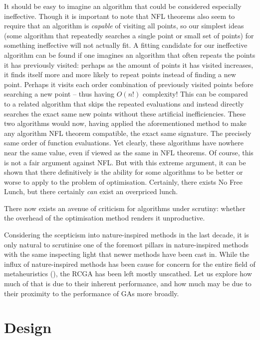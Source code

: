 \documentclass[
  a4paper,
]{article}
\newcommand{\+}{\phantom{-}}
\begin{document}
It should be easy to imagine an algorithm that could be considered
especially ineffective. Though it is important to note that NFL theorems
also seem to require that an algorithm is \emph{capable} of visiting all
points, so our simplest ideas (some algorithm that repeatedly searches a
single point or small set of points) for something ineffective will not
actually fit. A fitting candidate for our ineffective algorithm can be
found if one imagines an algorithm that often repeats the points it has
previously visited: perhaps as the amount of points it has visited
increases, it finds itself more and more likely to repeat points instead
of finding a new point. Perhaps it visits each order combination of
previously visited points before searching a new point -- thus having
\(O(n!)\) complexity! This can be compared to a related algorithm that
skips the repeated evaluations and instead directly searches the exact
same new points without these artificial inefficiencies. These two
algorithms would now, having applied the aforementioned method to make
any algorithm NFL theorem compatible, the exact same signature. The
precisely same order of function evaluations. Yet clearly, these
algorithms have nowhere near the same value, even if viewed as the same
in NFL theorems. Of course, this is not a fair argument against NFL. But
with this extreme argument, it can be shown that there definitively is
the ability for some algorithms to be better or worse to apply to the
problem of optimisation. Certainly, there exists No Free Lunch, but
there certainly \emph{can} exist an overpriced lunch.

There now exists an avenue of criticism for algorithms under scrutiny:
whether the overhead of the optimisation method renders it unproductive.

Considering the scepticism into nature-inspired methods in the last
decade, it is only natural to scrutinise one of the foremost pillars in
nature-inspired methods with the same inspecting light that newer
methods have been cast in. While the influx of nature-inspired methods
has been cause for concern for the entire field of metaheuristics
(), the RCGA has been left
mostly unscathed. Let us explore how much of that is due to their
inherent performance, and how much may be due to their proximity to the
performance of GAs more broadly.

\newpage

\section{Design}\label{design}
\end{document}
